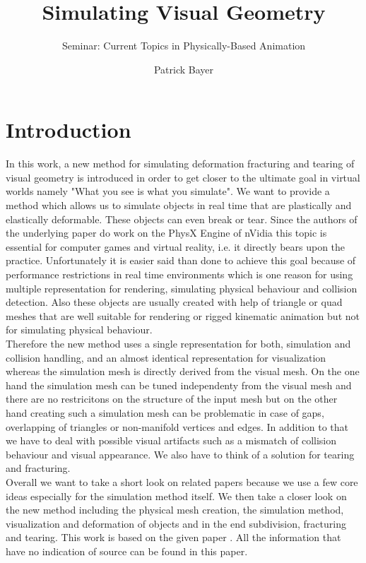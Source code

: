 \documentclass[
	11pt, 
	DIV10,
	a4paper, 
	oneside, 
	headings=normal, 
	captions=tableheading,
	final, 
	numbers=noenddot
]{scrartcl}
\title{Simulating Visual Geometry}
\subtitle{\vspace{0.5cm}Seminar: Current Topics in Physically-Based Animation}
\author{Patrick Bayer}
\begin{document}
\maketitle
\tableofcontents

\newpage

\section{Introduction}
	In this work, a new method for simulating deformation fracturing and tearing of visual geometry is introduced in order to get closer to the ultimate goal in virtual worlds namely "What you see is what you simulate". We want to provide a method which allows us to simulate objects in real time that are plastically and elastically deformable. These objects can even break or tear. Since the authors of the underlying paper do work on the PhysX Engine of nVidia this topic is essential for computer games and virtual reality, i.e. it directly bears upon the practice. Unfortunately it is easier said than done to achieve this goal because of performance restrictions in real time environments which is one reason for using multiple representation for rendering, simulating physical behaviour and collision detection. Also these objects are usually created with help of triangle or quad meshes that are well suitable for rendering or rigged kinematic animation but not for simulating physical behaviour.\\
	Therefore the new method uses a single representation for both, simulation and collision handling, and an almost identical representation for visualization whereas the simulation mesh is directly derived from the visual mesh. On the one hand the simulation mesh can be tuned independenty from the visual mesh and there are no restricitons on the structure of the input mesh but on the other hand creating such a simulation mesh can be problematic in case of gaps, overlapping of triangles or non-manifold vertices and edges. In addition to that we have to deal with possible visual artifacts such as a mismatch of collision behaviour and visual appearance. We also have to think of a solution for tearing and fracturing. \\
	Overall we want to take a short look on related papers because we use a few core ideas especially for the simulation method itself. We then take a closer look on the new method including the physical mesh creation, the simulation method, visualization and deformation of objects and in the end subdivision, fracturing and tearing. This work is based on the given paper \cite{1}. All the information that have no indication of source can be found in this paper. 
	
\end{document}

